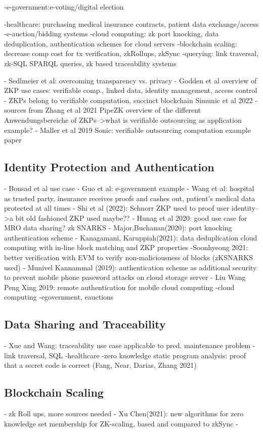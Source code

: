 -e-government:e-voting/digital election

-healthcare: purchasing medical insurance contracts, patient data exchange/access
-e-auction/bidding systems
-cloud computing: zk port knocking, data deduplication, authentication schemes for cloud servers
-blockchain scaling: decrease comp cost for tx verification, zkRollups, zkSync
-querying: link traversal, zk-SQL SPARQL queries, zk based traceability systems

- Sedlmeier et al: overcoming transparency vs. privacy
- Godden et al overview of ZKP use cases: verifiable comp., linked data, identity management, access control
- ZKPs belong to verifiable computation, succinct blockchain Simunic et al 2022
- sources from Zhang et al 2021 PipeZK overview of the different Anwendungsbereiche of ZKPs-->what is verifiable outsourcing as application example?
- Maller et al 2019 Sonic: verifiable outsourcing computation example paper

\subsection{Identity Protection and Authentication}
- Bonsad et al use case
- Guo et al: e-government example
- Wang et al: hospital as trusted party, insurance receives proofs and cashes out, patient's medical data protected at all times
- Shi et al (2022): Schnorr ZKP used to proof user identity-->a bit old fashioned ZKP used maybe??
- Hunag et al 2020: good use case for MRO data sharing? zk SNARKS
- Major,Buchanan(2020): port knocking authentication scheme
- Kanagamani, Karuppiah(2021): data deduplication cloud computing with in-line block matching and ZKP properties
-Soonhyeong 2021: better verification with EVM to verify non-maliciousness of blocks (zKSNARKS used)
- Munivel Kannammal (2019): authentication scheme as additional security to prevent mobile phone password attacks on cloud storage server
- Liu Wang Peng Xing 2019: remote authentication for mobile cloud computing
-cloud computing
-egovernment, eauctions


\subsection{Data Sharing and Traceability}
- Xue and Wang: traceability use case applicable to pred. maintenance problem
-link traversal, SQL
-healthcare
-zero knowledge static program analysis: proof that a secret code is correct (Fang, Near, Darias, Zhang 2021)

\subsection{Blockchain Scaling}
- zk Roll ups, more sources needed
- Xu Chen(2021): new algorithms for zero knowledge set membership for ZK-scaling, based and compared to zkSync
- 

